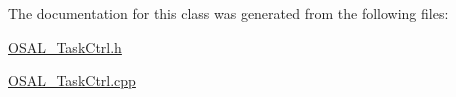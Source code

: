 The documentation for this class was generated from the following files\+:\begin{DoxyCompactItemize}
\item 
\mbox{\hyperlink{_o_s_a_l___task_ctrl_8h}{O\+S\+A\+L\+\_\+\+Task\+Ctrl.\+h}}\item 
\mbox{\hyperlink{_o_s_a_l___task_ctrl_8cpp}{O\+S\+A\+L\+\_\+\+Task\+Ctrl.\+cpp}}\end{DoxyCompactItemize}
